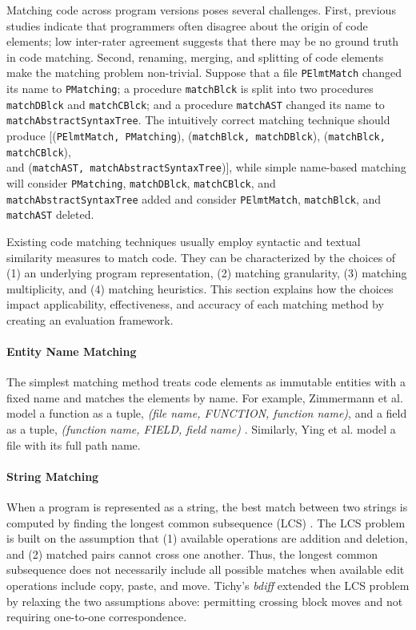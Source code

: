 \documentclass[runningheads,a4paper]{llncs}
\newcommand{\codefont}[1]{\footnotesize{\texttt{#1}}\normalsize}
\begin{document}
Matching code across program versions poses several challenges. 
First, previous studies \cite{SKim2005} indicate that programmers often disagree about the origin of code elements; low inter-rater agreement suggests that there may be no ground truth in code matching.
Second, renaming, merging, and splitting of code elements make the matching problem non-trivial. Suppose that a file \codefont{PElmtMatch} changed its name to \codefont{PMatching}; a procedure \codefont{matchBlck} is split into two procedures \codefont{matchDBlck} and \codefont{matchCBlck}; and a procedure \codefont{matchAST} changed its name to \codefont{matchAbstractSyntaxTree}. 
The intuitively correct matching technique should produce [(\codefont{PElmtMatch, PMatching}), (\codefont{matchBlck, matchDBlck}), (\codefont{matchBlck, matchCBlck}), \\and (\codefont{matchAST, matchAbstractSyntaxTree})], 
while simple name-based matching will consider \codefont{PMatching}, \codefont{matchDBlck}, \codefont{matchCBlck}, and \codefont{matchAbstractSyntaxTree} added and consider \codefont{PElmtMatch}, \codefont{matchBlck}, and \codefont{matchAST} deleted.

Existing code matching techniques usually employ syntactic and textual similarity measures to match code. They can be characterized by the choices of (1) an underlying program representation, (2) matching granularity, (3) matching multiplicity, and (4) matching heuristics. This section explains how the choices impact applicability, effectiveness, and accuracy of each matching method by creating an evaluation framework. 


\paragraph{Entity Name Matching}
The simplest matching method treats code elements as immutable entities with a fixed name and matches the elements by name. For example, Zimmermann et al. model a function as a tuple, \textit{(file name, FUNCTION, function name)}, and a field as a tuple, \textit{(function name, FIELD, field name)} \cite{Zimmermann2004}. Similarly, Ying et al. \cite{Ying2004} model a file with its full path name. %

\paragraph{String Matching}
When a program is represented as a string, the best match between two strings is computed by finding the longest common subsequence (LCS) \cite{Apostolico1997}. The LCS problem is built on the assumption that (1) available operations are addition and deletion, and (2) matched pairs cannot cross one another. Thus, the longest common subsequence does not necessarily include all possible matches when available edit operations include copy, paste, and move. Tichy's \textit{bdiff} \cite{Tichy1984} extended the LCS problem by relaxing the two assumptions above: permitting crossing block moves and not requiring one-to-one correspondence. 
\end{document}
